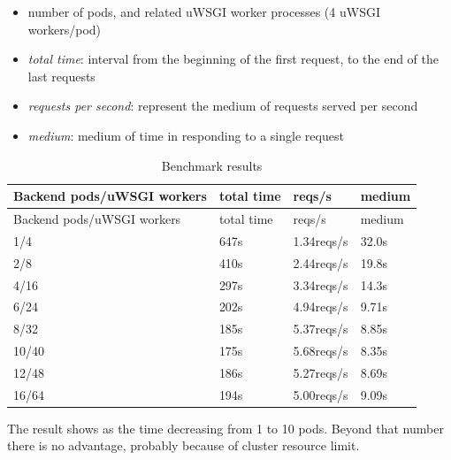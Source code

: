 \begin{itemize}
\item number of pods, and related uWSGI worker processes (4 uWSGI workers/pod)
\item \textit{total time}: interval from the beginning of the first request,   to the end of the last requests
\item \textit{requests per second}: represent the medium of requests served per second
\item \textit{medium}: medium of time in responding to a single request
\end{itemize}

\begin{longtable}[c]{@{}llll@{}}
\caption{Benchmark results}\tabularnewline
\toprule
Backend pods/uWSGI workers & total time & reqs/s & medium \tabularnewline
\midrule
\endfirsthead
\toprule
Backend pods/uWSGI workers & total time & reqs/s & medium \tabularnewline
\midrule
\endhead
1/4 & 647s & 1.34reqs/s & 32.0s \tabularnewline
2/8 & 410s & 2.44reqs/s & 19.8s \tabularnewline
4/16 & 297s & 3.34reqs/s & 14.3s \tabularnewline
6/24 & 202s & 4.94reqs/s & 9.71s \tabularnewline
8/32 & 185s & 5.37reqs/s & 8.85s \tabularnewline
10/40 & 175s & 5.68reqs/s & 8.35s \tabularnewline
12/48 & 186s & 5.27reqs/s & 8.69s \tabularnewline
16/64 & 194s & 5.00reqs/s & 9.09s \tabularnewline
\bottomrule
\end{longtable}

The result shows as the time decreasing from 1 to 10 pods. Beyond that number there is no advantage, probably because of cluster resource limit.